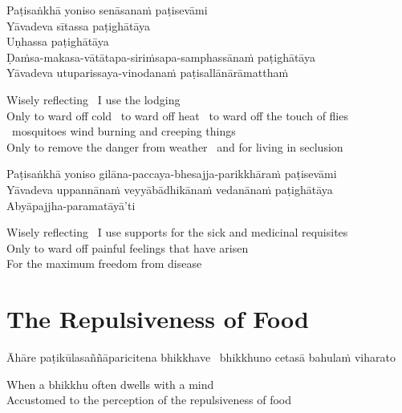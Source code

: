 Paṭisaṅkhā yoniso senāsanaṁ paṭisevāmi\\
Yāvadeva sītassa paṭighātāya\\
Uṇhassa paṭighātāya\\
Ḍaṁsa-makasa-vātātapa-siriṁsapa-samphassānaṁ paṭighātāya\\
Yāvadeva utuparissaya-vinodanaṁ paṭisallānārāmatthaṁ

\begin{english-verses}
  Wisely reflecting \breathmark\ I use the lodging\\
  Only to ward off cold \breathmark\ to ward off heat \breathmark\ to ward off the touch of flies \breathmark\ mosquitoes wind burning and creeping things\\
  Only to remove the danger from weather \breathmark\ and for living in seclusion
\end{english-verses}

Paṭisaṅkhā yoniso gilāna-paccaya-bhesajja-parikkhāraṁ paṭisevāmi\\
Yāvadeva uppannānaṁ veyyābādhikānaṁ vedanānaṁ paṭighātāya\\
Abyāpajjha-paramatāyā'ti

\begin{english-verses}
  Wisely reflecting \breathmark\ I use supports for the sick and medicinal requisites\\
  Only to ward off painful feelings that have arisen\\
  For the maximum freedom from disease
\end{english-verses}

\suttaRef{[MN 2]}


\section{The Repulsiveness of Food}
\label{repulsiveness-of-food}

\begin{leader}
\end{leader}

\begin{pali-hang}
Āhāre paṭikūlasaññāparicitena bhikkhave \breathmark\ bhikkhuno cetasā bahulaṁ viharato
\end{pali-hang}

\begin{english}
  When a bhikkhu often dwells with a mind\\
  Accustomed to the perception of the repulsiveness of food
\end{english}

